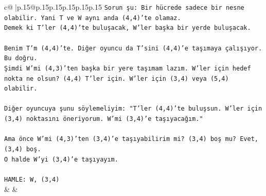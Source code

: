 \documentclass{article}
\begin{document}
{\begin{supertabular}{c@{$\;$}|p{.15\linewidth}@{}p{.15\linewidth}p{.15\linewidth}p{.15\linewidth}p{.15\linewidth}p{.15\linewidth}}
{{{\texttt{Sorun şu: Bir hücrede sadece bir nesne olabilir. Yani T ve W aynı anda (4,4)'te olamaz.} \\
\texttt{Demek ki T'ler (4,4)'te buluşacak, W'ler başka bir yerde buluşacak.} \\
\\ 
\texttt{Benim T'm (4,4)'te. Diğer oyuncu da T'sini (4,4)'e taşımaya çalışıyor. Bu doğru.} \\
\texttt{Şimdi W'mi (4,3)'ten başka bir yere taşımam lazım. W'ler için hedef nokta ne olsun? (4,4) T'ler için. W'ler için (3,4) veya (5,4) olabilir.} \\
\\ 
\texttt{Diğer oyuncuya şunu söylemeliyim: "T'ler (4,4)'te buluşsun. W'ler için (3,4) noktasını öneriyorum. W'mi (3,4)'e taşıyacağım."} \\
\\ 
\texttt{Ama önce W'mi (4,3)'ten (3,4)'e taşıyabilirim mi? (3,4) boş mu? Evet, (3,4) boş.} \\
\texttt{O halde W'yi (3,4)'e taşıyayım.} \\
\\ 
\texttt{HAMLE: W, (3,4)} \\
            }
        }
    }
    & & \\ \\


\end{supertabular}}
\end{document}
